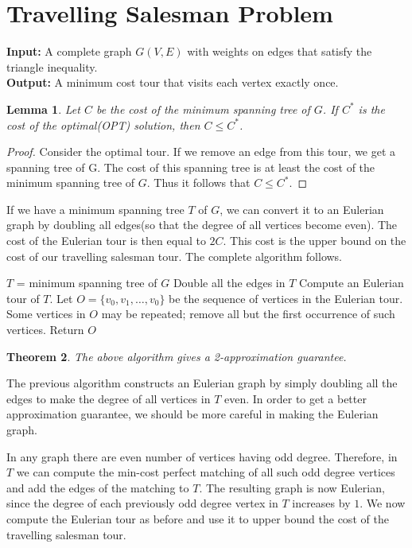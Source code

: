 \documentclass[10pt]{article}
\newtheorem{theorem}{Theorem}[section]
\newtheorem{lemma}[theorem]{Lemma}
\begin{document}
\section{Travelling Salesman Problem}
\textbf{Input: } A complete graph $G(V,E)$ with weights on edges that satisfy the triangle inequality. \\
\textbf{Output: } A minimum cost tour that visits each vertex exactly once. \\

\begin{lemma}
Let $C$ be the cost of the minimum spanning tree of $G$. If $C^*$ is the cost of the optimal(OPT) solution, then $C \leq C^*$.
\end{lemma}
\begin{proof}
Consider the optimal tour. If we remove an edge from this tour, we get a spanning tree of G. The cost of this spanning tree is at least the cost of the minimum spanning tree of $G$. Thus it follows that $C \leq C^*$.
\end{proof}
\bigskip

If we have a minimum spanning tree $T$ of $G$, we can convert it to an Eulerian graph by doubling all edges(so that the degree of all vertices become even). The cost of the Eulerian tour is then equal to $2C$. This cost is the upper bound on the cost of our travelling salesman tour. The complete algorithm follows.

\begin{algorithm}[H]
\dontprintsemicolon
$T$ = minimum spanning tree of $G$ \;
Double all the edges in $T$ \;
Compute an Eulerian tour of $T$. Let $O = \{v_0, v_1, \ldots , v_0\}$ be the sequence of vertices in the Eulerian tour. \;
Some vertices in $O$ may be repeated; remove all but the first occurrence of such vertices. \;
Return $O$ \;
\end{algorithm}

\begin{theorem}
The above algorithm gives a 2-approximation guarantee.
\end{theorem}
\bigskip

The previous algorithm constructs an Eulerian graph by simply doubling all the edges to make the degree of all vertices in $T$ even. In order to get a better approximation guarantee, we should be more careful in making the Eulerian graph.

In any graph there are even number of vertices having odd degree. Therefore, in $T$ we can compute the min-cost perfect matching of all such odd degree vertices and add the edges of the matching to $T$. The resulting graph is now Eulerian, since the degree of each previously odd degree vertex in $T$ increases by $1$. We now compute the Eulerian tour as before and use it to upper bound the cost of the travelling salesman tour.
\end{document}
